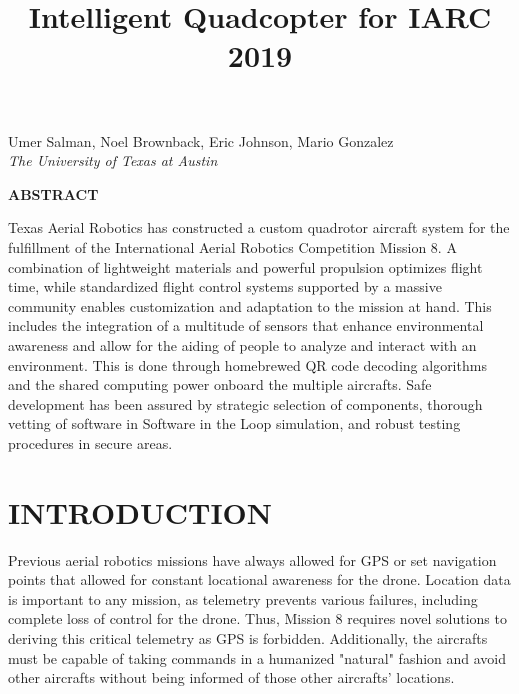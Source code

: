 \documentclass[12pt,letterpaper]{article}
\title{Intelligent Quadcopter for IARC 2019}
\newenvironment{nscenter}
 {\parskip=0pt\par\nopagebreak\centering}
 {\par\noindent\ignorespacesafterend}
\newcommand{\affiliatedauthor}[2]{
\begin{nscenter}
	#1 \\ \textit{#2}
\end{nscenter}
}
\renewcommand{\abstractname}{ABSTRACT}
\renewenvironment{abstract}
 {\vspace{-0.5ex}
	\small
	\begin{center}
		\bfseries \abstractname\vspace{-4ex}\vspace{0pt}
	\end{center}
	\list{}{
		\setlength{\leftmargin}{0.5in}
		\setlength{\rightmargin}{\leftmargin}
	}
	\item\relax}
 {\endlist}
\begin{document}
\begin{center}
	\textbf{\LARGE{\thetitle}}
\end{center}

\affiliatedauthor{Umer Salman, Noel Brownback, Eric Johnson, Mario Gonzalez}{The University of Texas at Austin}


\begin{abstract}
	Texas Aerial Robotics has constructed a custom quadrotor aircraft system for the fulfillment of the International Aerial Robotics Competition Mission 8. A combination of lightweight materials and powerful propulsion optimizes flight time, while standardized flight control systems supported by a massive community enables customization and adaptation to the mission at hand. This includes the integration of a multitude of sensors that enhance environmental awareness and allow for the aiding of people to analyze and interact with an environment. This is done through homebrewed QR code decoding algorithms and the shared computing power onboard the multiple aircrafts. Safe development has been assured by strategic selection of components, thorough vetting of software in Software in the Loop simulation, and robust testing procedures in secure areas.
\end{abstract}


\section*{INTRODUCTION}
	Previous aerial robotics missions have always allowed for GPS or set navigation points that allowed for constant locational awareness for the drone. Location data is important to any mission, as telemetry prevents various failures, including complete loss of control for the drone. Thus, Mission 8 requires novel solutions to deriving this critical telemetry as GPS is forbidden. Additionally, the aircrafts must be capable of taking commands in a humanized "natural" fashion and avoid other aircrafts without being informed of those other aircrafts' locations.
\end{document}
